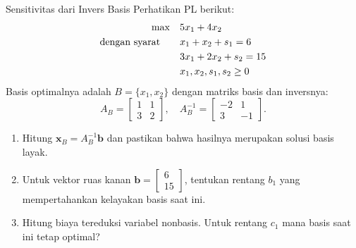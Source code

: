 \begin{ex}{Sensitivitas dari Invers Basis}{}
\label{ex:sensitivity-basis-inverse}
 Perhatikan PL berikut:
\[
\begin{aligned}
\max \quad & 5x_1 + 4x_2 \\
\mbox{dengan syarat}\quad \quad
& x_1 + x_2 + s_1 = 6 \\
& 3x_1 + 2x_2 + s_2 = 15 \\
& x_1, x_2, s_1, s_2 \geq 0
\end{aligned}
\]
Basis optimalnya adalah $B = \{x_1, x_2\}$ dengan matriks basis dan inversnya:
\[
A_B = \begin{bmatrix} 1 & 1 \\ 3 & 2 \end{bmatrix}, \quad
A_B^{-1} = \begin{bmatrix} -2 & 1 \\ 3 & -1 \end{bmatrix}.
\]
\begin{enumerate}
\item Hitung $\mathbf{x}_B = A_B^{-1}\mathbf{b}$ dan pastikan bahwa hasilnya merupakan solusi basis layak.
\item Untuk vektor ruas kanan $\mathbf{b} = \begin{bmatrix} 6 \\ 15 \end{bmatrix}$, tentukan rentang $b_1$ yang mempertahankan kelayakan basis saat ini.
\item Hitung biaya tereduksi variabel nonbasis. Untuk rentang $c_1$ mana basis saat ini tetap optimal?
\end{enumerate}
\exrefs{\S\ref{sec:sensitivity-matrix}}
\end{ex}

